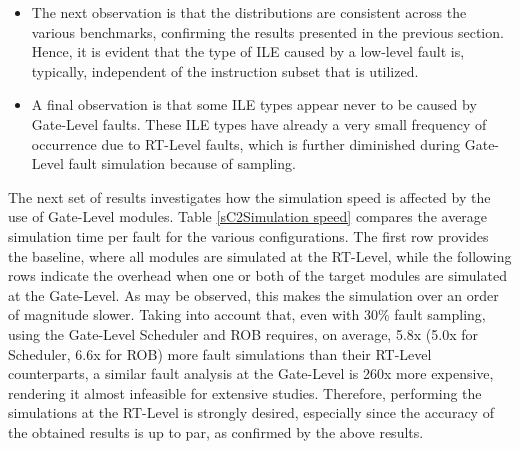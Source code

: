 \documentclass[12pt]{yalephd}
\newcommand{\snp}[1] {\noindent {\underline {#1}}}
\begin{document}
\begin{itemize}
\item The next observation is that the distributions are consistent across the various benchmarks, confirming the results presented in the previous section. Hence, it is evident that the type of ILE caused by a low-level fault is, typically, independent of the instruction subset that is utilized.

\item A final observation is that some ILE types appear never to be caused by Gate-Level faults. These ILE types have already a very small frequency of occurrence due to RT-Level faults, which is further diminished during Gate-Level fault simulation because of sampling.
\end{itemize}


\snp{Fault simulation speed:} The next set of results investigates how the simulation speed is affected by the use of Gate-Level modules. Table \ref{sC2Simulation speed} compares the average simulation time per fault for the various configurations. The first row provides the baseline, where all modules are simulated at the RT-Level, while the following rows indicate the overhead when one or both of the target modules are simulated at the Gate-Level. As may be observed, this makes the simulation over an order of magnitude slower. Taking into account that, even with 30\% fault sampling, using the Gate-Level Scheduler and ROB requires, on average, 5.8x (5.0x for Scheduler, 6.6x for ROB) more fault simulations than their RT-Level counterparts, a similar fault analysis at the Gate-Level is 260x more expensive, rendering it almost infeasible for extensive studies. Therefore, performing the simulations at the RT-Level is strongly desired, especially since the accuracy of the obtained results is up to par, as confirmed by the above results.
\end{document}
